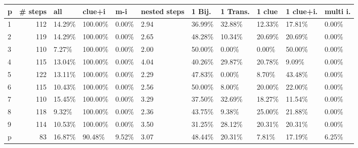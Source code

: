 \begin{tabular}{lrlllllllll}
\toprule
 p &  \# steps &     all &  clue+i  &    m-i & nested steps &  1 Bij. & 1 Trans. &  1 clue & 1 clue+i. & multi i. \\
\midrule
 1 &      112 &  14.29\% &  100.00\% &  0.00\% &         2.94 &  36.99\% &   32.88\% &  12.33\% &    17.81\% &    0.00\% \\
 2 &      119 &  14.29\% &  100.00\% &  0.00\% &         2.65 &  48.28\% &   10.34\% &  20.69\% &    20.69\% &    0.00\% \\
 3 &      110 &   7.27\% &  100.00\% &  0.00\% &         2.00 &  50.00\% &    0.00\% &   0.00\% &    50.00\% &    0.00\% \\
 4 &      115 &  13.04\% &  100.00\% &  0.00\% &         4.04 &  40.26\% &   29.87\% &  20.78\% &     9.09\% &    0.00\% \\
 5 &      122 &  13.11\% &  100.00\% &  0.00\% &         2.29 &  47.83\% &    0.00\% &   8.70\% &    43.48\% &    0.00\% \\
 6 &      115 &  10.43\% &  100.00\% &  0.00\% &         2.56 &  50.00\% &    8.00\% &  20.00\% &    22.00\% &    0.00\% \\
 7 &      110 &  15.45\% &  100.00\% &  0.00\% &         3.29 &  37.50\% &   32.69\% &  18.27\% &    11.54\% &    0.00\% \\
 8 &      118 &   9.32\% &  100.00\% &  0.00\% &         2.36 &  43.75\% &    9.38\% &  25.00\% &    21.88\% &    0.00\% \\
 9 &      114 &  10.53\% &  100.00\% &  0.00\% &         3.50 &  31.25\% &   28.12\% &  20.31\% &    20.31\% &    0.00\% \\
 p &       83 &  16.87\% &   90.48\% &  9.52\% &         3.07 &  48.44\% &   20.31\% &   7.81\% &    17.19\% &    6.25\% \\
\bottomrule
\end{tabular}
